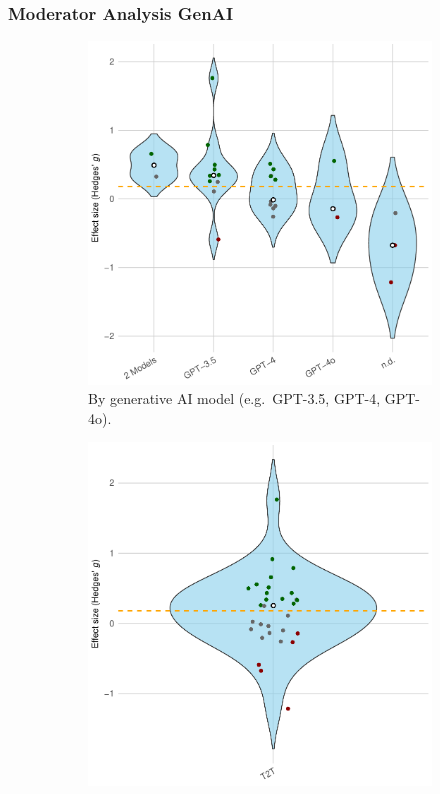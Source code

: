 \documentclass[manuscript, screen, review, acmsmall, anonymous]{acmart}
\begin{document}
\subsubsection{Moderator Analysis GenAI}
\label{sec:CreativePerformance_Moderator_GenAI}
\begin{figure}[H]
  \centering
  \begin{subfigure}[t]{0.49\linewidth}
    \centering
    \includegraphics[width=\linewidth]{plot_performance_raw_violin_GenAI_Model}
    \caption{By generative AI model (e.g.\ GPT-3.5, GPT-4, GPT-4o).}
    \label{fig:performance_raw_violin_genai_model}
  \end{subfigure}%
  \hfill
  \begin{subfigure}[t]{0.49\linewidth}
    \centering
    \includegraphics[width=\linewidth]{plot_performance_raw_violin_GenAI_Type}

\end{subfigure}
\end{figure}
\end{document}
